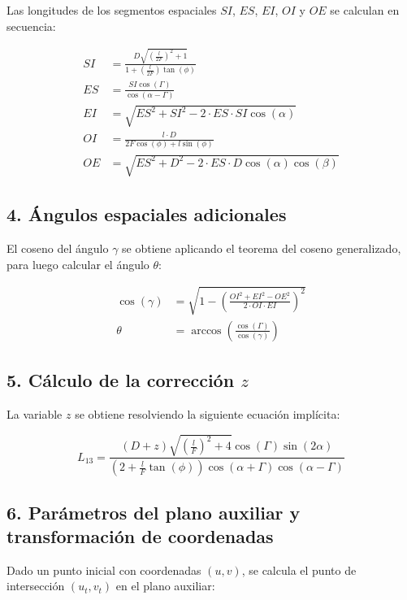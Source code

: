 Las longitudes de los segmentos espaciales $SI$, $ES$, $EI$, $OI$ y $OE$ se calculan en secuencia:

\begin{align}
SI &= \frac{D \sqrt{\left(\frac{l}{2F}\right)^2 + 1}}{1 + \left(\frac{l}{2F}\right) \tan(\phi)} \\
ES &= \frac{SI \cos(\Gamma)}{\cos(\alpha - \Gamma)} \\
EI &= \sqrt{ES^2 + SI^2 - 2 \cdot ES \cdot SI \cos(\alpha)} \\
OI &= \frac{l \cdot D}{2F \cos(\phi) + l \sin(\phi)} \\
OE &= \sqrt{ES^2 + D^2 - 2 \cdot ES \cdot D \cos(\alpha) \cos(\beta)}
\end{align}

\subsection*{4. Ángulos espaciales adicionales}

El coseno del ángulo $\gamma$ se obtiene aplicando el teorema del coseno generalizado, para luego calcular el ángulo $\theta$:

\begin{align}
\cos(\gamma) &= \sqrt{1 - \left(\frac{OI^2 + EI^2 - OE^2}{2 \cdot OI \cdot EI}\right)^2} \\
\theta &= \arccos\left(\frac{\cos(\Gamma)}{\cos(\gamma)}\right)
\end{align}

\subsection*{5. Cálculo de la corrección $z$}

La variable $z$ se obtiene resolviendo la siguiente ecuación implícita:

\begin{equation}
L_{13} = \frac{(D + z) \sqrt{\left(\frac{l}{F}\right)^2 + 4} \cos(\Gamma) \sin(2\alpha)}{\left(2 + \frac{l}{F} \tan(\phi)\right) \cos(\alpha + \Gamma) \cos(\alpha - \Gamma)}
\end{equation}

\subsection*{6. Parámetros del plano auxiliar y transformación de coordenadas}

Dado un punto inicial con coordenadas $(u, v)$, se calcula el punto de intersección $(u_t, v_t)$ en el plano auxiliar:

